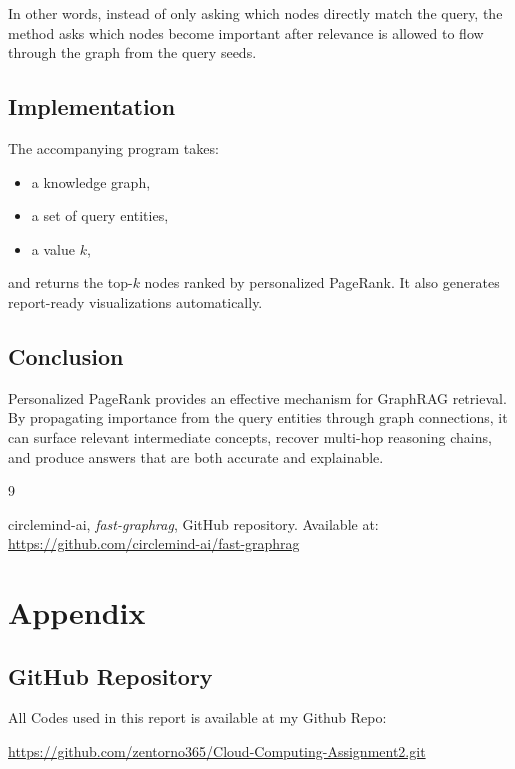 \documentclass[12pt]{article}
\begin{document}
In other words, instead of only asking which nodes directly match the query, the method asks which nodes become important after relevance is allowed to flow through the graph from the query seeds.

\subsection{Implementation}

The accompanying program takes:
\begin{itemize}
    \item a knowledge graph,
    \item a set of query entities,
    \item a value $k$,
\end{itemize}
and returns the top-$k$ nodes ranked by personalized PageRank. It also generates report-ready visualizations automatically.

\subsection{Conclusion}

Personalized PageRank provides an effective mechanism for GraphRAG retrieval. By propagating importance from the query entities through graph connections, it can surface relevant intermediate concepts, recover multi-hop reasoning chains, and produce answers that are both accurate and explainable.


\begin{thebibliography}{9}

circlemind-ai,
\textit{fast-graphrag},
GitHub repository.
Available at: \url{https://github.com/circlemind-ai/fast-graphrag}

\end{thebibliography}

\newpage
\appendix
\section{Appendix}

\subsection{GitHub Repository}

All Codes used in this report is available at my Github Repo:
\begin{center}
\url{https://github.com/zentorno365/Cloud-Computing-Assignment2.git}
\end{center}
\end{document}
